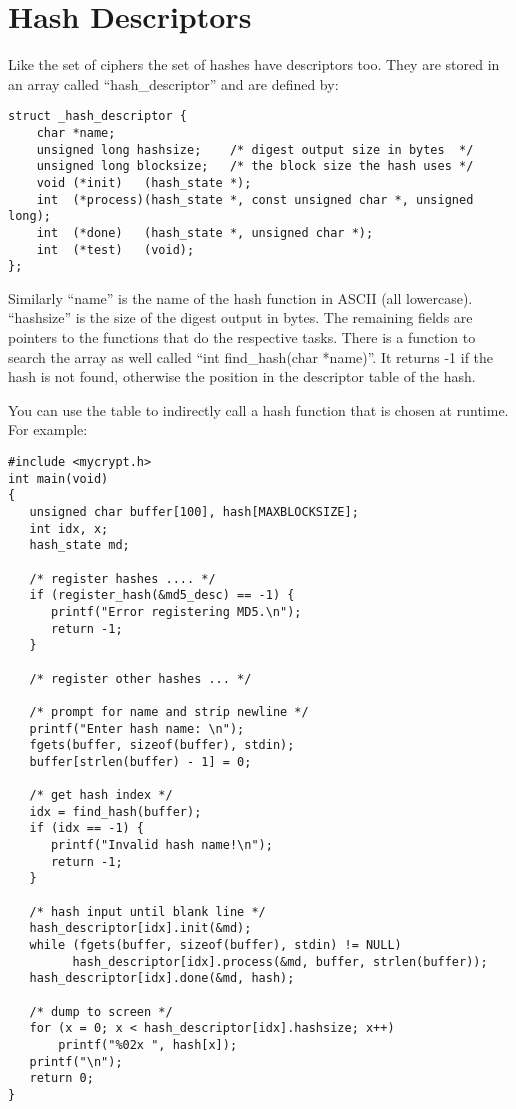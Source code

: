 \documentclass[b5paper]{book}
\begin{document}
\section{Hash Descriptors}
Like the set of ciphers the set of hashes have descriptors too.  They are stored in an array called ``hash\_descriptor'' and
are defined by:
\begin{verbatim}
struct _hash_descriptor {
    char *name;
    unsigned long hashsize;    /* digest output size in bytes  */
    unsigned long blocksize;   /* the block size the hash uses */
    void (*init)   (hash_state *);
    int  (*process)(hash_state *, const unsigned char *, unsigned long);
    int  (*done)   (hash_state *, unsigned char *);
    int  (*test)   (void);
};
\end{verbatim}

Similarly ``name'' is the name of the hash function in ASCII (all lowercase).  ``hashsize'' is the size of the digest output
in bytes.  The remaining fields are pointers to the functions that do the respective tasks.  There is a function to
search the array as well called ``int find\_hash(char *name)''.  It returns -1 if the hash is not found, otherwise the
position in the descriptor table of the hash.

You can use the table to indirectly call a hash function that is chosen at runtime.  For example:
\begin{small}
\begin{verbatim}
#include <mycrypt.h>
int main(void)
{
   unsigned char buffer[100], hash[MAXBLOCKSIZE];
   int idx, x;
   hash_state md;

   /* register hashes .... */
   if (register_hash(&md5_desc) == -1) {
      printf("Error registering MD5.\n");
      return -1;
   }

   /* register other hashes ... */

   /* prompt for name and strip newline */
   printf("Enter hash name: \n");
   fgets(buffer, sizeof(buffer), stdin);
   buffer[strlen(buffer) - 1] = 0;

   /* get hash index */
   idx = find_hash(buffer);
   if (idx == -1) {
      printf("Invalid hash name!\n");
      return -1;
   }

   /* hash input until blank line */
   hash_descriptor[idx].init(&md);
   while (fgets(buffer, sizeof(buffer), stdin) != NULL)
         hash_descriptor[idx].process(&md, buffer, strlen(buffer));
   hash_descriptor[idx].done(&md, hash);

   /* dump to screen */
   for (x = 0; x < hash_descriptor[idx].hashsize; x++)
       printf("%02x ", hash[x]);
   printf("\n");
   return 0;
}
\end{verbatim}
\end{small}
\end{document}
